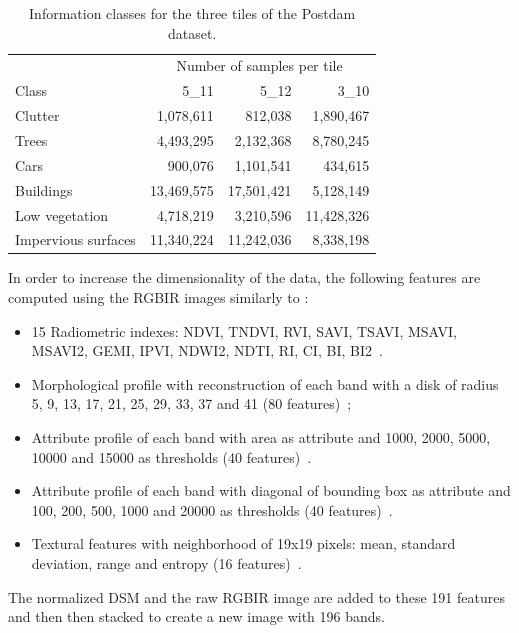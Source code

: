 \documentclass[journal]{IEEEtran}
\begin{document}
    \begin{table}[!t]
        \centering
        \caption{Information classes for the three tiles of the Postdam dataset.\label{tab:potsdam}}
        \begin{tabular}[b]{lrrr}\toprule
          & \multicolumn{3}{c}{Number of samples per tile}\\
            \cmidrule{2-4}
            Class &   5\_11  &   5\_12  & 3\_10 \\
          \midrule
          Clutter             & 1,078,611  & 812,038    & 1,890,467 \\
          Trees               & 4,493,295  & 2,132,368  & 8,780,245 \\
          Cars                & 900,076    & 1,101,541  & 434,615 \\
          Buildings           & 13,469,575 & 17,501,421 & 5,128,149 \\
          Low vegetation      & 4,718,219  & 3,210,596  & 11,428,326 \\
          Impervious surfaces & 11,340,224 & 11,242,036 & 8,338,198 \\
          \bottomrule
        \end{tabular}
    \end{table}

    In order to increase the dimensionality of the data, the following features are computed using the RGBIR images similarly to \cite{tuia2015multiclass}:
    \begin{itemize}
        \item 15 Radiometric indexes: NDVI, TNDVI, RVI, SAVI, TSAVI, MSAVI, MSAVI2, GEMI, IPVI, NDWI2, NDTI, RI, CI, BI, BI2~\cite{otb}.
        \item Morphological profile with reconstruction of each band with a disk of radius 5, 9, 13, 17, 21, 25, 29, 33, 37 and 41 (80 features)~\cite{fauvel2013advances};
        \item Attribute profile of each band with area as attribute and 1000, 2000, 5000, 10000 and 15000 as thresholds (40 features)~\cite{dalla2010morphological}.
        \item Attribute profile of each band with diagonal of bounding box as attribute and 100, 200, 500, 1000 and 20000 as thresholds (40 features)~\cite{dalla2010morphological}.
        \item Textural features with neighborhood of 19x19 pixels: mean, standard deviation, range and entropy (16 features)~\cite{otb}.
    \end{itemize}
    The normalized DSM and the raw  RGBIR image are added to these 191
    features and  then then  stacked to  create a  new image  with 196
    bands. %
\end{document}
